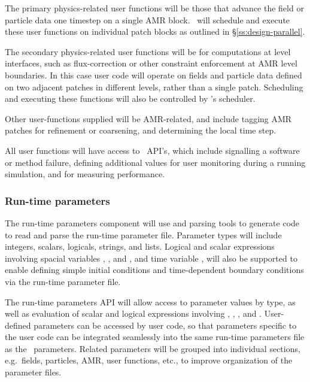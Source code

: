 \documentclass[10pt,twocolumn]{article}
\begin{document}
The primary physics-related user functions will be those that advance
the field or particle data one timestep on a single AMR block.
\cello\ will schedule and execute these user functions on individual
patch blocks as outlined in \S\ref{ss:design-parallel}.

The secondary physics-related user functions will be for computations
at level interfaces, such as flux-correction or other constraint
enforcement at AMR level boundaries.  In this case user code will
operate on fields and particle data defined on two adjacent patches in
different levels, rather than a single patch.  Scheduling and
executing these functions will also be controlled by \cello's scheduler.

Other user-functions supplied will be AMR-related, and include tagging
AMR patches for refinement or coarsening, and determining the local
time step.

All user functions will have access to \cello\ API's, which include
signalling a software or method failure, defining additional
values for user monitoring during a running simulation, and for
measuring performance.

\subsubsection{Run-time parameters} \label{sss:design-parameters}

The run-time parameters component will use  and
 parsing tools to generate code to read and parse the
run-time parameter file.  Parameter types will include integers,
scalars, logicals, strings, and lists.  Logical and scalar expressions
involving spacial variables , , and , and time
variable , will also be supported to enable defining simple
initial conditions and time-dependent boundary conditions via the
run-time parameter file.

The run-time parameters API will allow access to parameter values by
type, as well as evaluation of scalar and logical expressions
involving , , , and .  User-defined
parameters can be accessed by user code, so that parameters specific
to the user code can be integrated seamlessly into the same run-time
parameters file as the \cello\ parameters.  Related parameters will be
grouped into individual sections, e.g.~fields, particles, AMR, user
functions, etc., to improve organization of the parameter files.
\end{document}
